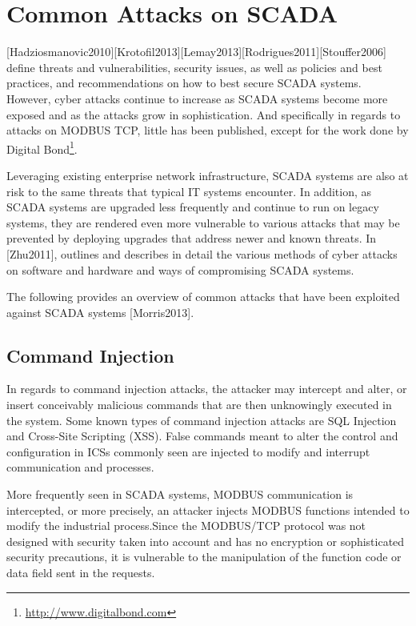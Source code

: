 \documentclass[12pt,]{article}
\begin{document}
\pagebreak

\section{Common Attacks on SCADA}\label{common-attacks-on-scada}

{[}Hadziosmanovic2010{]}{[}Krotofil2013{]}{[}Lemay2013{]}{[}Rodrigues2011{]}{[}Stouffer2006{]}
define threats and vulnerabilities, security issues, as well as policies
and best practices, and recommendations on how to best secure SCADA
systems. However, cyber attacks continue to increase as SCADA systems
become more exposed and as the attacks grow in sophistication. And
specifically in regards to attacks on MODBUS TCP, little has been
published, except for the work done by Digital Bond\footnote{\url{http://www.digitalbond.com}}.

Leveraging existing enterprise network infrastructure, SCADA systems are
also at risk to the same threats that typical IT systems encounter. In
addition, as SCADA systems are upgraded less frequently and continue to
run on legacy systems, they are rendered even more vulnerable to various
attacks that may be prevented by deploying upgrades that address newer
and known threats. In {[}Zhu2011{]}, outlines and describes in detail
the various methods of cyber attacks on software and hardware and ways
of compromising SCADA systems.

The following provides an overview of common attacks that have been
exploited against SCADA systems {[}Morris2013{]}.

\subsection{Command Injection}\label{command-injection}

In regards to command injection attacks, the attacker may intercept and
alter, or insert conceivably malicious commands that are then
unknowingly executed in the system. Some known types of command
injection attacks are SQL Injection and Cross-Site Scripting (XSS).
False commands meant to alter the control and configuration in ICSs
commonly seen are injected to modify and interrupt communication and
processes.

More frequently seen in SCADA systems, MODBUS communication is
intercepted, or more precisely, an attacker injects MODBUS functions
intended to modify the industrial process.Since the MODBUS/TCP protocol
was not designed with security taken into account and has no encryption
or sophisticated security precautions, it is vulnerable to the
manipulation of the function code or data field sent in the requests.
\end{document}
